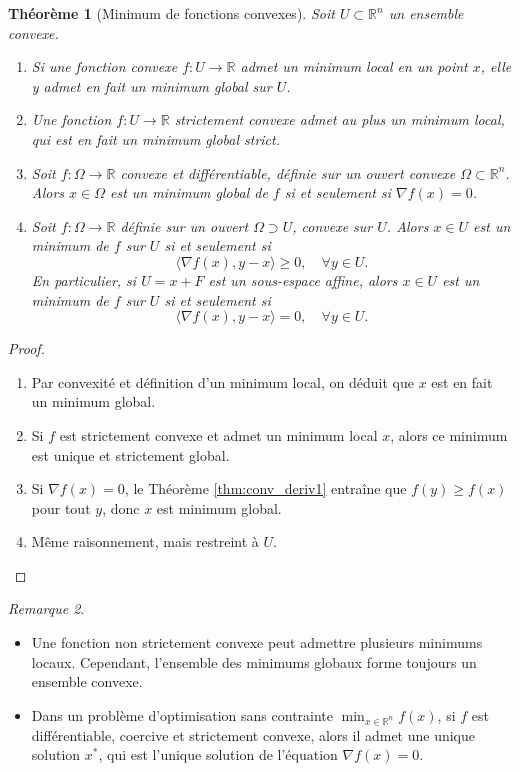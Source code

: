 \documentclass[a4paper,12pt,openany]{book}
\theoremstyle{plain}
\newtheorem{theorem}{Théorème}[section]
\theoremstyle{definition}
\theoremstyle{remark}
\newtheorem{remark}[theorem]{Remarque}
\theoremstyle{nbstyle}
\newcommand{\R}{\mathbb{R}}
\begin{document}
	\begin{theorem}[Minimum de fonctions convexes]\label{thm:min_conv}
		Soit $U \subset \R^n$ un ensemble convexe.
		\begin{enumerate}%
			\item Si une fonction convexe $f:U\to \R$ admet un minimum local en un point $x$, elle y admet en fait un minimum global sur $U$.
			\item Une fonction $f:U\to\R$ strictement convexe admet au plus un minimum local, qui est en fait un minimum global strict.
			\item Soit $f:\Omega \to \R$ convexe et différentiable, définie sur un ouvert convexe $\Omega \subset \R^n$. Alors $x \in \Omega$ est un minimum global de $f$ si et seulement si $\nabla f(x)=0$.
			\item Soit $f:\Omega \to \R$ définie sur un ouvert $\Omega \supset U$, convexe sur $U$. Alors $x \in U$ est un minimum de $f$ sur $U$ si et seulement si
			\[
			\langle \nabla f(x), y-x \rangle \geq 0, \quad \forall y \in U.
			\]
			En particulier, si $U = x+F$ est un sous-espace affine, alors $x \in U$ est un minimum de $f$ sur $U$ si et seulement si
			\[
			\langle \nabla f(x), y-x \rangle = 0, \quad \forall y \in U.
			\]
		\end{enumerate}
	\end{theorem}
	
	\begin{proof}%
		\begin{enumerate}%
			\item Par convexité et définition d’un minimum local, on déduit que $x$ est en fait un minimum global.
			\item Si $f$ est strictement convexe et admet un minimum local $x$, alors ce minimum est unique et strictement global.
			\item Si $\nabla f(x)=0$, le Théorème \ref{thm:conv_deriv1} entraîne que $f(y)\geq f(x)$ pour tout $y$, donc $x$ est minimum global.
			\item Même raisonnement, mais restreint à $U$.
		\end{enumerate}
	\end{proof}
	
	\begin{remark}
		\begin{itemize}
			\item Une fonction non strictement convexe peut admettre plusieurs minimums locaux. Cependant, l’ensemble des minimums globaux forme toujours un ensemble convexe.
			\item Dans un problème d’optimisation sans contrainte $\displaystyle\min_{x \in \R^n} f(x)$, si $f$ est différentiable, coercive et strictement convexe, alors il admet une unique solution $x^*$, qui est l’unique solution de l’équation $\nabla f(x)=0$.
		\end{itemize}
	\end{remark}
	
\end{document}
